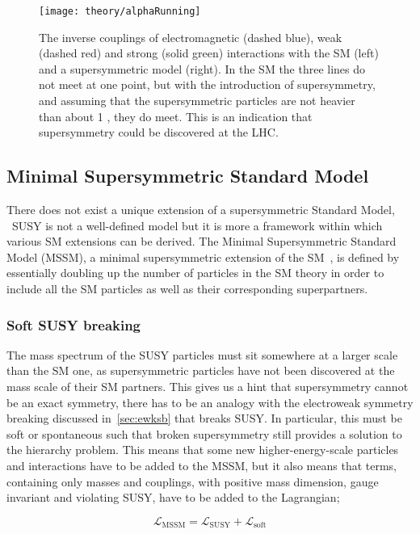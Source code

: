 			\begin{figure}[!htb]
				\centering
				\texttt{[image: theory/alphaRunning]}
				\caption{\label{fig:alphaRunning} The inverse couplings of electromagnetic (dashed blue), weak (dashed red) and strong (solid green) interactions with the SM (left) and a supersymmetric model (right). In the SM the three lines do not meet at one point, but with the introduction of supersymmetry, and assuming that the supersymmetric particles are not heavier than about 1 \TeV, they do meet. This is an indication that supersymmetry could be discovered at the LHC.}
			\end{figure}



		\subsection{Minimal Supersymmetric Standard Model}
		\label{sec:MSSM}
			
			There does not exist a unique extension of a supersymmetric Standard Model, \ie\ SUSY is not a well-defined model but it is more a framework within which various SM extensions can be derived.
			The Minimal Supersymmetric Standard Model (MSSM), a minimal supersymmetric extension of the SM~\cite{Jegerlehner:2013nna}, is defined by essentially doubling up the number of particles in the SM theory in order to include all the SM particles as well as their corresponding superpartners.

			\subsubsection*{Soft SUSY breaking}
				
				The mass spectrum of the SUSY particles must sit somewhere at a larger scale than the SM one, as supersymmetric particles have not been discovered at the mass scale of their SM partners. This gives us a hint that supersymmetry cannot be an exact symmetry, there has to be an analogy with the electroweak symmetry breaking discussed in~\ref{sec:ewksb} that breaks SUSY. In particular, this must be soft or spontaneous such that broken supersymmetry still provides a solution to the hierarchy problem. This means that some new higher-energy-scale particles and interactions have to be added to the MSSM, but it also means that terms, containing only masses and couplings, with positive mass dimension, gauge invariant and violating SUSY, have to be added to the Lagrangian;

				\begin{equation}
				\label{eq:soft_sb}
					\mathcal L_{\mathrm{MSSM}} = \mathcal {L_{\mathrm{SUSY}}} + \mathcal {L_{\mathrm{soft}}}
				\end{equation}

